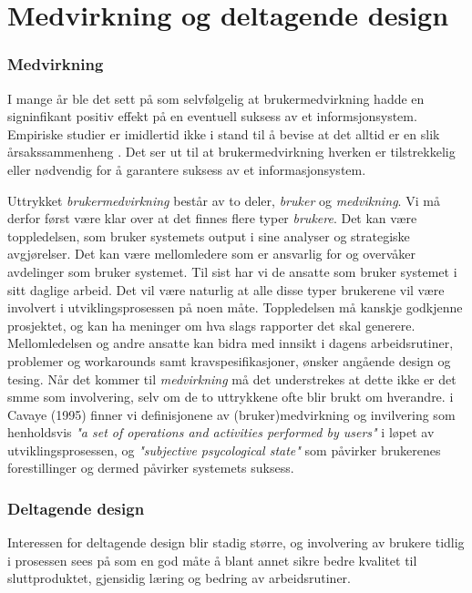 \section{Medvirkning og deltagende design}
\label{chp: medvirkning}

\subsubsection{Medvirkning}
I mange år ble det sett på som selvfølgelig at brukermedvirkning hadde en signinfikant positiv effekt på en eventuell suksess av et informsjonsystem. Empiriske studier er imidlertid ikke i stand til å bevise at det alltid er en slik årsakssammenheng \cite{Cavaye95}. Det ser ut til at brukermedvirkning hverken er tilstrekkelig eller nødvendig for å garantere suksess av et informasjonsystem. 

Uttrykket \emph{brukermedvirkning} består av to deler, \emph{bruker} og \emph{medvikning}. Vi må derfor først være klar over at det finnes flere typer \emph{brukere}. Det kan være toppledelsen, som bruker systemets output i sine analyser og strategiske avgjørelser. Det kan være mellomledere som er ansvarlig for og overvåker avdelinger som bruker systemet. Til sist har vi de ansatte som bruker systemet i sitt daglige arbeid. Det vil være naturlig at alle disse typer brukerene vil være involvert i utviklingsprosessen på noen måte. Toppledelsen må kanskje godkjenne prosjektet, og kan ha meninger om hva slags rapporter det skal generere. Mellomledelsen og andre ansatte kan bidra med innsikt i dagens arbeidsrutiner, problemer og workarounds samt kravspesifikasjoner, ønsker angående design og tesing. Når det kommer til \emph{medvirkning} må det understrekes at dette ikke er det smme som involvering, selv om de to uttrykkene ofte blir brukt om hverandre. i Cavaye (1995) finner vi definisjonene av (bruker)medvirkning og invilvering som henholdsvis \emph{"a set of operations and activities performed by users"} i løpet av utviklingsprosessen, og \emph{"subjective psycological state"} som påvirker brukerenes forestillinger og dermed påvirker systemets suksess.

\subsubsection{Deltagende design}
Interessen for deltagende design blir stadig større, og involvering av brukere tidlig i prosessen sees på som en god måte å blant annet sikre bedre kvalitet til sluttproduktet, gjensidig læring og bedring av arbeidsrutiner.

